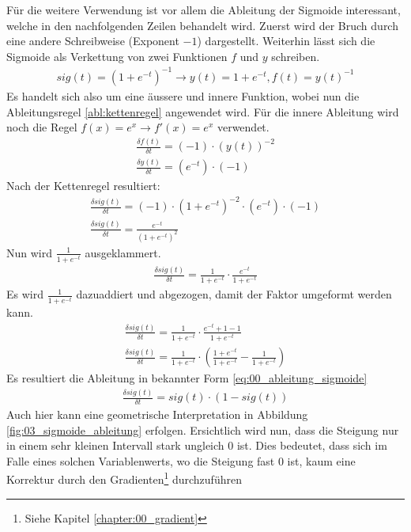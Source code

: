 Für die weitere Verwendung ist vor allem die Ableitung der Sigmoide interessant, welche in den nachfolgenden
Zeilen behandelt wird. Zuerst wird der Bruch durch eine andere Schreibweise (Exponent $-1$) dargestellt. Weiterhin
lässt sich die Sigmoide als Verkettung von zwei Funktionen $f$ und $y$ schreiben.
\begin{align}
    sig(t) = (1 + e^{-t})^{-1} \longrightarrow y(t) = 1 + e^{-t}, f(t) = y(t)^{-1}
\end{align}
Es handelt sich also um eine äussere und innere Funktion, wobei nun die Ableitungsregel \ref{abl:kettenregel} angewendet wird.
Für die innere Ableitung wird noch die Regel $f(x) = e^x \longrightarrow f'(x) = e^x$ verwendet.
\begin{align}
    \frac{\delta f(t)}{\delta t} = (-1) \cdot (y(t))^{-2}\\
    \frac{\delta y(t)}{\delta t} = (e^{-t}) \cdot (-1)
\end{align}
Nach der Kettenregel resultiert:
\begin{align}
    \frac{\delta sig(t)}{\delta t} = (-1) \cdot (1 + e^{-t})^{-2} \cdot (e^{-t}) \cdot (-1)\\
    \frac{\delta sig(t)}{\delta t} = \frac{e^{-t}}{(1 + e^{-t})^{2}}
\end{align}
Nun wird $\frac{1}{1 + e^{-t}}$ ausgeklammert.
\begin{align}
    \frac{\delta sig(t)}{\delta t} = \frac{1}{1 + e^{-t}} \cdot \frac{e^{-t}}{1 + e^{-t}}
\end{align}
Es wird $\frac{1}{1 + e^{-t}}$ dazuaddiert und abgezogen, damit der Faktor umgeformt werden kann.
\begin{align}
    \frac{\delta sig(t)}{\delta t} = \frac{1}{1 + e^{-t}} \cdot \frac{e^{-t} + 1 - 1}{1 + e^{-t}}\\
    \frac{\delta sig(t)}{\delta t} = \frac{1}{1 + e^{-t}} \cdot (\frac{1 + e^{-t}}{1 + e^{-t}} - \frac{1}{1 + e^{-t}})
\end{align}
Es resultiert die Ableitung in bekannter Form \ref{eq:00_ableitung_sigmoide}
\begin{align}
    \frac{\delta sig(t)}{\delta t} = sig(t) \cdot (1 - sig(t))\label{eq:00_ableitung_sigmoide}
\end{align}
Auch hier kann eine geometrische Interpretation in Abbildung \ref{fig:03_sigmoide_ableitung} erfolgen. Ersichtlich
wird nun, dass die Steigung nur in einem sehr kleinen Intervall stark ungleich $0$ ist. Dies bedeutet, dass sich im
Falle eines solchen Variablenwerts, wo die Steigung fast $0$ ist, kaum eine Korrektur durch den Gradienten\footnote{Siehe Kapitel \ref{chapter:00_gradient}} durchzuführen
